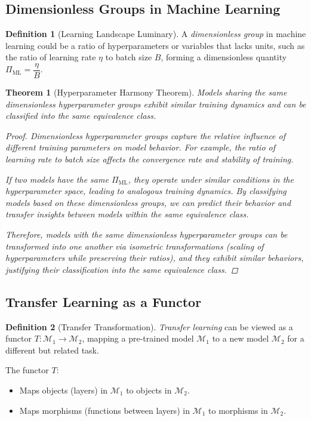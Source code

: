 \documentclass{article}
\newtheorem{theorem}{Theorem}[section]
\theoremstyle{definition}
\newtheorem{definition}{Definition}[section]
\theoremstyle{remark}
\begin{document}
	\subsection{Dimensionless Groups in Machine Learning}
	
	\begin{definition}[Learning Landscape Luminary]
		A \emph{dimensionless group} in machine learning could be a ratio of hyperparameters or variables that lacks units, such as the ratio of learning rate $\eta$ to batch size $B$, forming a dimensionless quantity $\Pi_{\text{ML}} = \dfrac{\eta}{B}$.
	\end{definition}
	
	\begin{theorem}[Hyperparameter Harmony Theorem]
		Models sharing the same dimensionless hyperparameter groups exhibit similar training dynamics and can be classified into the same equivalence class.
		
		\begin{proof}
			Dimensionless hyperparameter groups capture the relative influence of different training parameters on model behavior. For example, the ratio of learning rate to batch size affects the convergence rate and stability of training.
			
			If two models have the same $\Pi_{\text{ML}}$, they operate under similar conditions in the hyperparameter space, leading to analogous training dynamics. By classifying models based on these dimensionless groups, we can predict their behavior and transfer insights between models within the same equivalence class.
			
			Therefore, models with the same dimensionless hyperparameter groups can be transformed into one another via isometric transformations (scaling of hyperparameters while preserving their ratios), and they exhibit similar behaviors, justifying their classification into the same equivalence class.
		\end{proof}
	\end{theorem}
	
	\subsection{Transfer Learning as a Functor}
	
	\begin{definition}[Transfer Transformation]
		\emph{Transfer learning} can be viewed as a functor $T: \mathcal{M}_1 \rightarrow \mathcal{M}_2$, mapping a pre-trained model $\mathcal{M}_1$ to a new model $\mathcal{M}_2$ for a different but related task.
		
		The functor $T$:
		\begin{itemize}
			\item Maps objects (layers) in $\mathcal{M}_1$ to objects in $\mathcal{M}_2$.
			\item Maps morphisms (functions between layers) in $\mathcal{M}_1$ to morphisms in $\mathcal{M}_2$.
		\end{itemize}
	\end{definition}
	
\end{document}
